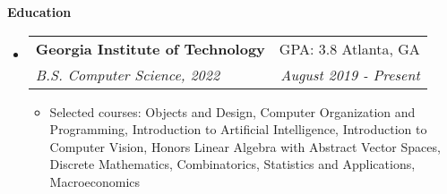 \documentclass[letterpaper,10pt]{article}
\makeatletter
\newcommand{\resitem}[1]{\item #1 \vspace{-3.5pt}}
\newcommand{\resheading}[1]{{\large \colorbox{mygrey}{\begin{minipage}{\textwidth}{\textbf{#1 \vphantom{p\^{E}}}}\end{minipage}}}}
\newcommand{\ressubheading}[4]{
\begin{tabular*}{7.0in}{l@{\extracolsep{\fill}}r}
		\textbf{#1} & #2 \\
		\textit{#3} & \textit{#4} \\
\end{tabular*}\vspace{-6pt}}
\makeatother
\begin{document}
\resheading{Education}
\begin{itemize}
\item[]  %
    \ressubheading{Georgia Institute of Technology}{GPA: 3.8 \hspace{1em} Atlanta, GA}{B.S. Computer Science, 2022}{August 2019 - Present}
	\begin{itemize}
	    \resitem{Selected courses: Objects and Design, Computer Organization and Programming, Introduction to Artificial Intelligence, Introduction to Computer Vision, Honors Linear Algebra with Abstract Vector Spaces, Discrete Mathematics, Combinatorics, Statistics and Applications, Macroeconomics}
	\end{itemize}
\end{itemize}
\end{document}
